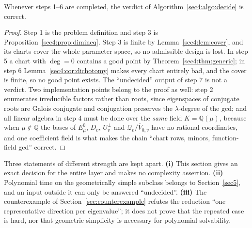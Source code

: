 \begin{prop}[Correctness]
\label{sec4:prop:correct}
Whenever steps 1--6 are completed, the verdict of Algorithm~\ref{sec4:algo:decide} is correct.
\end{prop}

\begin{proof}
Step 1 is the problem definition and step 3 is Proposition~\ref{sec4:prop:dimineq}. Step 3 is finite by
Lemma~\ref{sec4:lem:cover}, and its charts cover the whole parameter space, so no admissible design is
lost. In step 5 a chart with $\deg=0$ contains a good point by Theorem~\ref{sec4:thm:generic}; in step 6
Lemma~\ref{sec4:cor:dichotomy} makes every chart entirely bad, and the cover is finite, so no good
point exists. The ``undecided'' output of step 7 is not a verdict. Two implementation points belong to
the proof as well: step 2 enumerates irreducible factors rather than roots, since eigenspaces of
conjugate roots are Galois conjugate and conjugation preserves the $\lambda$-degree of the gcd; and
all linear algebra in step 4 must be done over the \emph{same} field $K=\mathbb Q(\mu)$, because when
$\mu\notin\mathbb Q$ the bases of $E_\mu^0$, $D_v$, $U_v^\perp$ and
$\mathcal Q_v/\overline V_{0,v}$ have no rational coordinates, and one coefficient field is what makes
the chain ``chart rows, minors, function-field gcd'' correct.
\end{proof}

Three statements of different strength are kept apart. \textbf{(i)} This section gives an exact
decision for the entire layer and makes no complexity assertion. \textbf{(ii)} Polynomial time on the
geometrically simple subclass belongs to Section~\ref{sec5}, and an input outside it can only be
answered ``undecided''. \textbf{(iii)} The counterexample of Section~\ref{sec:counterexample} refutes
the reduction ``one representative direction per eigenvalue''; it does not prove that the repeated
case is hard, nor that geometric simplicity is necessary for polynomial solvability.
